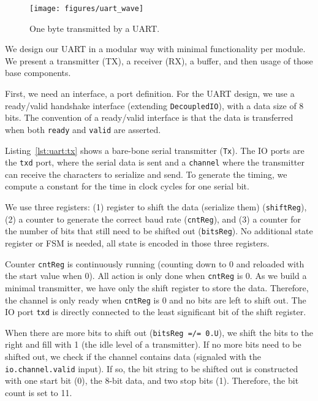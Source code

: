 \documentclass[%
    10pt,
    headinclude, footexclude,
    openright, %
    notitlepage,
    cleardoubleempty,
    headsepline,
    pointlessnumbers,
    bibtotoc, idxtotoc,
    ]{scrbook}
\newcommand{\code}[1]{{\small{\texttt{#1}}}}
\begin{document}
\begin{figure}
  \centering
  \texttt{[image: figures/uart\_wave]}
  \caption{One byte transmitted by a UART.}
  \label{fig:uart:wave}
\end{figure}

We design our UART in a modular way with minimal functionality
per module. We present a transmitter (TX), a receiver (RX),
a buffer, and then usage of those base components.

First, we need an interface, a port definition.
For the UART design, we use a ready/valid handshake interface (extending \code{DecoupledIO}),
with a data size of 8 bits.
\noindent The convention of a ready/valid interface is that the data is transferred
when both \code{ready} and \code{valid} are asserted.


Listing~\ref{lst:uart:tx} shows a bare-bone serial transmitter (\code{Tx}).
The IO ports are the \code{txd} port, where the serial data is sent and
a \code{channel} where the transmitter can receive the characters to serialize
and send.
To generate the timing, we compute a constant for
the time in clock cycles for one serial bit.

We use three registers:
(1) register to shift the data (serialize them) (\code{shiftReg}),
(2) a counter to generate the correct baud rate (\code{cntReg}), and
(3) a counter for the number of bits that still need to be shifted out (\code{bitsReg}).
No additional state register or FSM is needed, all state is encoded in
those three registers.

Counter \code{cntReg} is continuously running (counting down to 0
and reloaded with the start value when 0). All action is only done when
\code{cntReg} is 0. As we build a minimal transmitter, we have only
the shift register to store the data. Therefore, the channel is only ready
when \code{cntReg} is 0 and no bits are left to shift out.
The IO port \code{txd} is directly connected to the least significant bit
of the shift register.

When there are more bits to shift out (\code{bitsReg =/= 0.U}),
we shift the bits to the right and fill with 1 (the idle level
of a transmitter).
If no more bits need to be shifted out, we check if the channel contains
data (signaled with the \code{io.channel.valid} input). If so, the bit string to
be shifted out is constructed with one start bit (0), the 8-bit data, and
two stop bits (1). Therefore, the bit count is set to 11.
\end{document}
